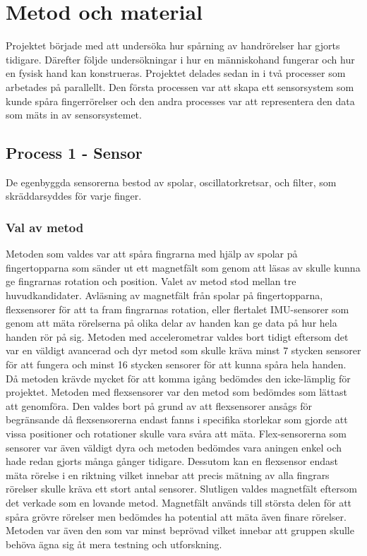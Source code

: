\documentclass[a4paper]{article}
\makeatletter
\let\\\@raggedtwoe@savedcr%
\makeatother
\begin{document}
\begin{sloppypar}
    \newpage
    \section{Metod och material}


    Projektet började med att undersöka hur spårning av handrörelser har gjorts tidigare.
    Därefter följde undersökningar i hur en människohand fungerar och hur en fysisk hand kan konstrueras.
    Projektet delades sedan in i två processer som arbetades på parallellt. Den första processen var att skapa ett sensorsystem som kunde spåra fingerrörelser
    och den andra processes var att representera den data som mäts in av sensorsystemet.

    \subsection{Process 1 - Sensor}
    De egenbyggda sensorerna bestod av spolar, oscillatorkretsar, och filter, som skräddarsyddes för varje finger.
    \subsubsection{Val av metod}
    Metoden som valdes var att spåra fingrarna med hjälp av spolar på fingertopparna som
    sänder ut ett magnetfält som genom att läsas av skulle kunna ge fingrarnas rotation
    och position. Valet av metod stod mellan tre huvudkandidater. Avläsning av magnetfält
    från spolar på fingertopparna, flexsensorer för att ta fram fingrarnas rotation, eller
    flertalet IMU-sensorer som genom att mäta rörelserna på olika delar av handen kan
    ge data på hur hela handen rör på sig.
    \\\\
    Metoden med accelerometrar valdes bort tidigt eftersom det var en väldigt avancerad och
    dyr metod som skulle kräva minst 7 stycken sensorer för att fungera och minst 16 stycken
    sensorer för att kunna spåra hela handen. Då metoden krävde mycket för att komma
    igång bedömdes den icke-lämplig för projektet.
    \\\\
    Metoden med flexsensorer var den metod som bedömdes som lättast att genomföra. Den
    valdes bort på grund av att flexsensorer ansågs för begränsande då flexsensorerna
    endast fanns i specifika storlekar som gjorde att vissa positioner och rotationer
    skulle vara svåra att mäta. Flex-sensorerna som sensorer var även väldigt dyra och
    metoden bedömdes vara aningen enkel och hade redan gjorts många gånger tidigare.
    Dessutom kan en flexsensor endast mäta rörelse i en riktning vilket innebar att
    precis mätning av alla fingrars rörelser skulle kräva ett stort antal sensorer.
    \\\\
    Slutligen valdes magnetfält eftersom det verkade som en lovande metod. Magnetfält
    används till största delen för att spåra grövre rörelser men bedömdes ha potential
    att mäta även finare rörelser. Metoden var även den som var minst beprövad vilket
    innebar att gruppen skulle behöva ägna sig åt mera testning och utforskning.





\end{sloppypar}
\end{document}
